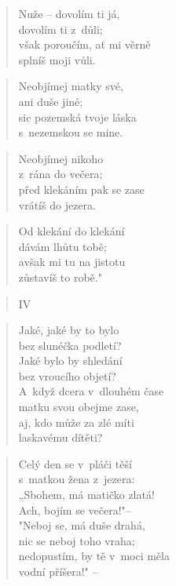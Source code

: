\begin{verse}
Nuže -- dovolím ti já, \\
dovolím ti z~důli; \\
však poroučím, ať mi věrně \\
splníš moji vůli.
\end{verse}

\begin{verse}
Neobjímej matky své, \\
ani duše jiné; \\
sic pozemská tvoje láska \\
s~nezemskou se mine.
\end{verse}

\begin{verse}
Neobjímej nikoho \\
z~rána do večera; \\
před klekáním pak se zase \\
vrátíš do jezera.
\end{verse}

\begin{verse}
Od klekání do klekání \\
dávám lhůtu tobě; \\
avšak mi tu na jistotu \\
zůstavíš to robě."
\end{verse}

\begin{verse}
IV
\end{verse}

\begin{verse}
Jaké, jaké by to bylo \\
bez slunéčka podletí? \\
Jaké bylo by shledání \\
bez vroucího objetí? \\
A~když dcera v~dlouhém čase \\
matku svou obejme zase, \\
aj, kdo může za zlé míti \\
laskavému dítěti?
\end{verse}

\begin{verse}
Celý den se v~pláči těší \\
s~matkou žena z~jezera: \\
„Sbohem, má matičko zlatá! \\
Ach, bojím se večera!"-- \\
"Neboj se, má duše drahá, \\
nic se neboj toho vraha; \\
nedopustím, by tě v~moci měla \\
vodní příšera!" --
\end{verse}

